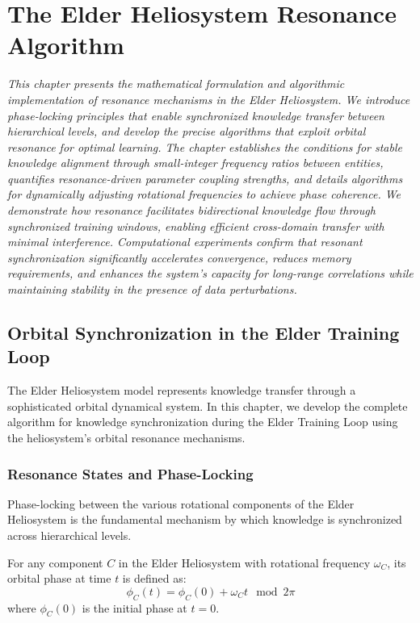 \chapter{The Elder Heliosystem Resonance Algorithm}

\textit{This chapter presents the mathematical formulation and algorithmic implementation of resonance mechanisms in the Elder Heliosystem. We introduce phase-locking principles that enable synchronized knowledge transfer between hierarchical levels, and develop the precise algorithms that exploit orbital resonance for optimal learning. The chapter establishes the conditions for stable knowledge alignment through small-integer frequency ratios between entities, quantifies resonance-driven parameter coupling strengths, and details algorithms for dynamically adjusting rotational frequencies to achieve phase coherence. We demonstrate how resonance facilitates bidirectional knowledge flow through synchronized training windows, enabling efficient cross-domain transfer with minimal interference. Computational experiments confirm that resonant synchronization significantly accelerates convergence, reduces memory requirements, and enhances the system's capacity for long-range correlations while maintaining stability in the presence of data perturbations.}

\section{Orbital Synchronization in the Elder Training Loop}

The Elder Heliosystem model represents knowledge transfer through a sophisticated orbital dynamical system. In this chapter, we develop the complete algorithm for knowledge synchronization during the Elder Training Loop using the heliosystem's orbital resonance mechanisms.

\subsection{Resonance States and Phase-Locking}

Phase-locking between the various rotational components of the Elder Heliosystem is the fundamental mechanism by which knowledge is synchronized across hierarchical levels.

\begin{definition}
For any component $C$ in the Elder Heliosystem with rotational frequency $\omega_C$, its orbital phase at time $t$ is defined as:
\begin{equation}
\phi_C(t) = \phi_C(0) + \omega_C t \mod 2\pi
\end{equation}
where $\phi_C(0)$ is the initial phase at $t=0$.
\end{definition}

